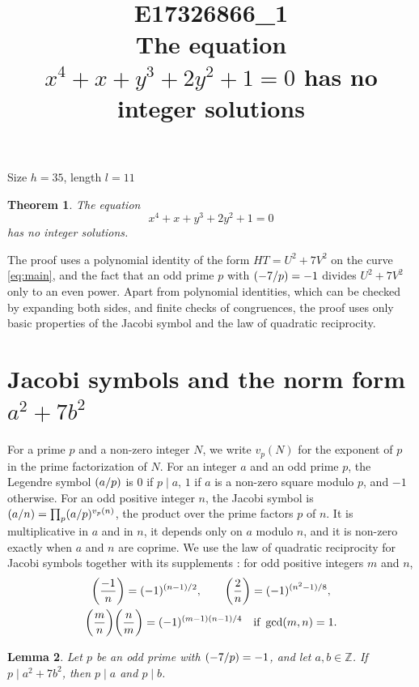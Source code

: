 \documentclass[11pt]{article}
\title{\textbf{E17326866\_1}\\[4pt] {\Large The equation $x^{4}+x+y^{3}+2y^{2}+1=0$ has no integer solutions}}
\author{}
\date{}
\newtheorem{theorem}{Theorem}
\newtheorem{lemma}[theorem]{Lemma}
\newcommand{\Z}{\mathbb{Z}}
\newcommand{\leg}[2]{\mathchoice{\biggl(\dfrac{#1}{#2}\biggr)}{(#1/#2)}{(#1/#2)}{(#1/#2)}}
\begin{document}
\maketitle
\vspace{-8ex}
\begin{center}
Size $h=35$, length $l=11$
\end{center}

\begin{theorem}\label{thm:main}
The equation
\begin{equation}\label{eq:main}
x^{4}+x+y^{3}+2y^{2}+1=0
\end{equation}
has no integer solutions.
\end{theorem}

The proof uses a polynomial identity of the form $HT=U^2+7V^2$ on the curve \eqref{eq:main}, and the fact that an odd prime $p$ with $\leg{-7}{p}=-1$ divides $U^2+7V^2$ only to an even power. Apart from polynomial identities, which can be checked by expanding both sides, and finite checks of congruences, the proof uses only basic properties of the Jacobi symbol and the law of quadratic reciprocity.

\section{\texorpdfstring{Jacobi symbols and the norm form $a^2+7b^2$}{Jacobi symbols and the norm form}}

For a prime $p$ and a non-zero integer $N$, we write $v_p(N)$ for the exponent of $p$ in the prime factorization of $N$. For an integer $a$ and an odd prime $p$, the Legendre symbol $\leg{a}{p}$ is $0$ if $p\mid a$, $1$ if $a$ is a non-zero square modulo $p$, and $-1$ otherwise. For an odd positive integer $n$, the Jacobi symbol is $\leg{a}{n}=\prod_p\leg{a}{p}^{v_p(n)}$, the product over the prime factors $p$ of $n$. It is multiplicative in $a$ and in $n$, it depends only on $a$ modulo $n$, and it is non-zero exactly when $a$ and $n$ are coprime. We use the law of quadratic reciprocity for Jacobi symbols together with its supplements \cite[Chapter~5, \S2]{IR}: for odd positive integers $m$ and $n$,
\begin{gather*}
\leg{-1}{n}=(-1)^{(n-1)/2},\qquad\leg{2}{n}=(-1)^{(n^2-1)/8},\\
\leg{m}{n}\leg{n}{m}=(-1)^{(m-1)(n-1)/4}\quad\text{if }\gcd(m,n)=1.
\end{gather*}

\begin{lemma}\label{lem:divides}
Let $p$ be an odd prime with $\leg{-7}{p}=-1$, and let $a,b\in\Z$. If $p\mid a^2+7b^2$, then $p\mid a$ and $p\mid b$.
\end{lemma}
\end{document}
